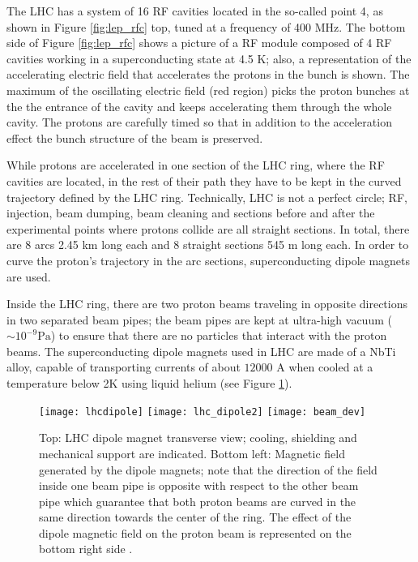 The LHC has a system of 16 RF cavities located in the so-called point 4, as shown in Figure \ref{fig:lep_rfc} top, tuned at a frequency of 400 MHz. The bottom side of Figure \ref{fig:lep_rfc} shows a picture of a RF module composed of 4 RF cavities working in a superconducting state at 4.5 K; also, a representation of the accelerating electric field that accelerates the protons in the bunch is shown. The maximum of the oscillating electric field (red region) picks the proton bunches at the the entrance of the cavity and keeps accelerating them through the whole cavity. The protons are carefully timed so that in addition to the acceleration effect the bunch structure of the beam is preserved.    

While protons are accelerated in one section of the LHC ring, where the RF cavities are located, in the rest of their path they have to be kept in the curved trajectory defined by the LHC ring. Technically, LHC is not a perfect circle; RF, injection, beam dumping, beam cleaning and sections before and after the experimental points where protons collide are all straight sections. In total, there are 8 arcs 2.45 km long each and 8 straight sections 545 m long each. In order to curve the proton's trajectory in the arc sections, superconducting dipole magnets are used.               

Inside the LHC ring, there are two proton beams traveling in opposite directions in two separated beam pipes; the beam pipes are kept at ultra-high vacuum (${\sim 10^{-9}\textrm{Pa}}$) to ensure that there are no particles that interact with the proton beams. The superconducting dipole magnets used in LHC are made of a NbTi alloy, capable of transporting currents of about $12000$ A when cooled at a temperature below 2K using liquid helium (see Figure \ref{fig:lhcdipole}).

\begin{figure}[!h]
\centering
\texttt{[image: lhcdipole]}
\texttt{[image: lhc\_dipole2]}
\texttt{[image: beam\_dev]}
\caption [LHC dipole magnet.]{Top: LHC dipole magnet transverse view; cooling, shielding and mechanical support are indicated. Bottom left: Magnetic field generated by the dipole magnets; note that the direction of the field inside one beam pipe is opposite with respect to the other beam pipe which guarantee that both proton beams are curved in the same direction towards the center of the ring. The effect of the dipole magnetic field on the proton beam is represented on the bottom right side \cite{lhc_dipole, dipole_field,video}.}\label{fig:lhcdipole}
\end{figure}

